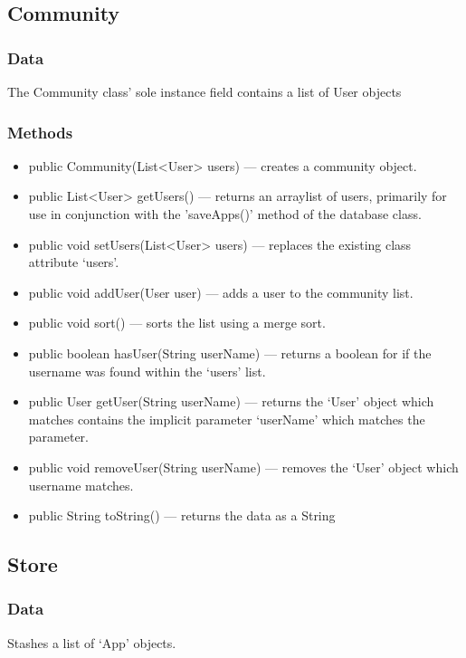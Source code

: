 \documentclass{article}
\begin{document}
\subsection{Community}
\subsubsection{Data}
The Community class' sole instance field contains a list of User objects
\subsubsection{Methods}
\begin{itemize}
    \item{public Community(List<User> users)}
        --- creates a community object.
    \item{public List<User> getUsers()}
        --- returns an arraylist of users, primarily for use in conjunction with the 'saveApps()' method of the database class.
    \item{public void setUsers(List<User> users)}
        --- replaces the existing class attribute `users'.
    \item{public void addUser(User user)}
        --- adds a user to the community list.
    \item{public void sort()}
        --- sorts the list using a merge sort.
    \item{public boolean hasUser(String userName)}
        --- returns a boolean for if the username was found within the `users' list.
    \item{public User getUser(String userName)}
        --- returns the `User' object which matches contains the implicit parameter `userName' which matches the parameter.
    \item{public void removeUser(String userName)}
        --- removes the `User' object which username matches.
    \item{public String toString()}
        --- returns the data as a String
\end{itemize}
\subsection{Store}
\subsubsection{Data}
Stashes a list of `App' objects.
\end{document}
